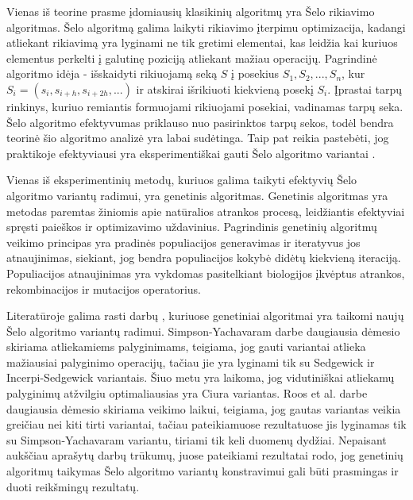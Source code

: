 \documentclass{VUMIFInfBakalaurinis}
\begin{document}
Vienas iš teorine prasme įdomiausių klasikinių algoritmų yra Šelo rikiavimo algoritmas.
Šelo algoritmą galima laikyti rikiavimo įterpimu optimizacija, kadangi atliekant rikiavimą yra lyginami ne tik gretimi elementai,
kas leidžia kai kuriuos elementus perkelti į galutinę poziciją atliekant mažiau operacijų.
Pagrindinė algoritmo idėja - išskaidyti rikiuojamą seką $S$ į posekius $S_1, S_2, ..., S_n$, kur
$S_i = (s_i, s_{i+h}, s_{i+2h}, ...)$ ir atskirai išrikiuoti kiekvieną posekį $S_i$.
Įprastai tarpų rinkinys, kuriuo remiantis formuojami rikiuojami posekiai, vadinamas tarpų seka.
Šelo algoritmo efektyvumas priklauso nuo pasirinktos tarpų sekos, todėl bendra teorinė šio algoritmo analizė yra labai sudėtinga.
Taip pat reikia pastebėti, jog praktikoje efektyviausi yra eksperimentiškai gauti Šelo algoritmo variantai \cite{ciura2001best,tokuda1992}.

Vienas iš eksperimentinių metodų, kuriuos galima taikyti efektyvių Šelo algoritmo variantų radimui, yra genetinis algoritmas.
Genetinis algoritmas yra metodas paremtas žiniomis apie natūralios atrankos procesą, leidžiantis efektyviai spręsti paieškos ir optimizavimo uždavinius.
Pagrindinis genetinių algoritmų veikimo principas yra pradinės populiacijos generavimas ir iteratyvus jos atnaujinimas, siekiant, jog
bendra populiacijos kokybė didėtų kiekvieną iteraciją.
Populiacijos atnaujinimas yra vykdomas pasitelkiant biologijos įkvėptus atrankos, rekombinacijos ir mutacijos operatorius.

Literatūroje galima rasti darbų \cite{roos2002genetic,simpson1999faster}, kuriuose genetiniai algoritmai yra taikomi naujų Šelo algoritmo variantų radimui.
Simpson-Yachavaram darbe daugiausia dėmesio skiriama atliekamiems palyginimams, teigiama, jog gauti variantai atlieka mažiausiai palyginimo operacijų,
tačiau jie yra lyginami tik su Sedgewick ir Incerpi-Sedgewick variantais.
Šiuo metu yra laikoma, jog vidutiniškai atliekamų palyginimų atžvilgiu optimaliausias yra Ciura \cite{ciura2001best} variantas.
Roos et al. darbe daugiausia dėmesio skiriama veikimo laikui, teigiama, jog gautas variantas veikia greičiau nei kiti tirti variantai, tačiau
pateikiamuose rezultatuose jis lyginamas tik su Simpson-Yachavaram variantu, tiriami tik keli duomenų dydžiai.
Nepaisant aukščiau aprašytų darbų trūkumų, juose pateikiami rezultatai rodo, jog genetinių algoritmų taikymas Šelo algoritmo variantų konstravimui
gali būti prasmingas ir duoti reikšmingų rezultatų.
\end{document}
